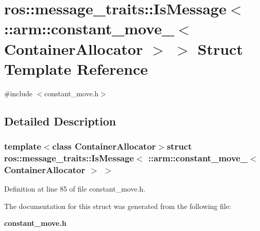 \section{ros\-:\-:message\-\_\-traits\-:\-:\-Is\-Message$<$ \-:\-:arm\-:\-:constant\-\_\-move\-\_\-$<$ \-Container\-Allocator $>$ $>$ \-Struct \-Template \-Reference}
\label{structros_1_1message__traits_1_1IsMessage_3_01_1_1arm_1_1constant__move___3_01ContainerAllocator_01_4_01_4}


{\ttfamily \#include $<$constant\-\_\-move.\-h$>$}



\subsection{\-Detailed \-Description}
\subsubsection*{template$<$class Container\-Allocator$>$struct ros\-::message\-\_\-traits\-::\-Is\-Message$<$ \-::arm\-::constant\-\_\-move\-\_\-$<$ Container\-Allocator $>$ $>$}



\-Definition at line 85 of file constant\-\_\-move.\-h.



\-The documentation for this struct was generated from the following file\-:\begin{DoxyCompactItemize}
\item 
{\bf constant\-\_\-move.\-h}\end{DoxyCompactItemize}
